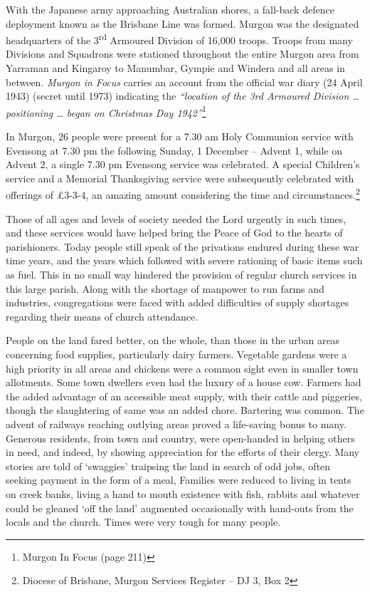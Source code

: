 With the Japanese army approaching Australian shores, a fall-back defence deployment known as the Brisbane Line was formed. Murgon was the designated headquarters of the 3\textsuperscript{rd} Armoured Division of 16,000 troops. Troops from many Divisions and Squadrons were stationed throughout the entire Murgon area from Yarraman and Kingaroy to Manumbar, Gympie and Windera and all areas in between. \emph{Murgon in Focus} carries an account from the official war diary (24 April 1943) (secret until 1973) indicating the \emph{``location of the 3rd Armoured Division \ldots{} positioning \ldots{} began on Christmas Day 1942''}\footnote{Murgon In Focus (page 211)}

In Murgon, 26 people were present for a 7.30 am Holy Communion service with Evensong at 7.30 pm the following Sunday, 1 December -- Advent 1, while on Advent 2, a single 7.30 pm Evensong service was celebrated. A special Children's service and a Memorial Thanksgiving service were subsequently celebrated with offerings of £3-3-4, an amazing amount considering the time and circumstances.\footnote{Diocese of Brisbane, Murgon Services Register -- DJ 3, Box 2}

Those of all ages and levels of society needed the Lord urgently in such times, and these services would have helped bring the Peace of God to the hearts of parishioners. Today people still speak of the privations endured during these war time years, and the years which followed with severe rationing of basic items such as fuel. This in no small way hindered the provision of regular church services in this large parish. Along with the shortage of manpower to run farms and industries, congregations were faced with added difficulties of supply shortages regarding their means of church attendance.

People on the land fared better, on the whole, than those in the urban areas concerning food supplies, particularly dairy farmers. Vegetable gardens were a high priority in all areas and chickens were a common sight even in smaller town allotments. Some town dwellers even had the luxury of a house cow. Farmers had the added advantage of an accessible meat supply, with their cattle and piggeries, though the slaughtering of same was an added chore. Bartering was common. The advent of railways reaching outlying areas proved a life-saving bonus to many. Generous residents, from town and country, were open-handed in helping others in need, and indeed, by showing appreciation for the efforts of their clergy. Many stories are told of `swaggies' traipsing the land in search of odd jobs, often seeking payment in the form of a meal, Families were reduced to living in tents on creek banks, living a hand to mouth existence with fish, rabbits and whatever could be gleaned `off the land' augmented occasionally with hand-outs from the locals and the church. Times were very tough for many people.

